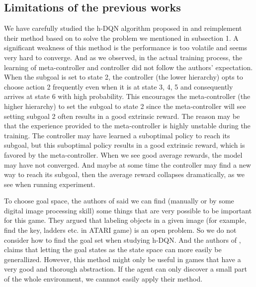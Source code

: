 \documentclass{article}
\begin{document}
\begin{spacing}{1.1}
    \subsection{Limitations of the previous works}
    We have carefully studied the h-DQN algorithm proposed in \cite{AI-16} and reimplement their method based on \cite{github} to solve the problem we mentioned in subsection 1. A significant weakness of this method is the performance is too volatile and seems very hard to converge. And as we observed, in the actual training process, the learning of meta-controller and controller did not follow the authors' expectation. When the subgoal is set to state 2, the controller (the lower hierarchy) opts to choose action 2 frequently even when it is at state 3, 4, 5 and consequently arrives at state 6 with high probability. This encourages the meta-controller (the higher hierarchy) to set the subgoal to state 2 since the meta-controller will see setting subgoal 2 often results in a good extrinsic reward. The reason may be that the experience provided to the meta-controller is highly unstable during the training. The controller may have learned a suboptimal policy to reach its subgoal, but this suboptimal policy results in a good extrinsic reward, which is favored by the meta-controller. When we see good average rewards, the model may have not converged. And maybe at some time the controller may find a new way to reach its subgoal, then the average reward collapses dramatically, as we see when running experiment.

    To choose goal space, the authors of \cite{AI-16} said we can find (manually or by some digital image processing skill) some things that are very possible to be important for this game. They argued that labeling objects in a given image (for example, find the key, ladders etc. in ATARI game) is an open problem. So we do not consider how to find the goal set when studying h-DQN. And the authors of \cite{AI-18}, claims that letting the goal states as the state space can more easily be generallized. However, this method might only be useful in games that have a very good and thorough abstraction. If the agent can only discover a small part of the whole environment, we cannnot easily apply their method.


\end{spacing}
\end{document}
